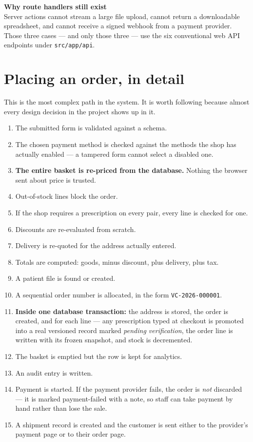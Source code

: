 \documentclass[11pt,a4paper]{report}
\newcommand{\code}[1]{\texttt{\small #1}}
\newcommand{\keybox}[2]{%
  \begin{center}
  \begin{minipage}{0.94\textwidth}
  \colorbox{vclight}{\parbox{\dimexpr\textwidth-2\fboxsep}{%
    \vspace{3pt}\textbf{\color{vcblue}#1}\\[3pt]#2\vspace{4pt}}}
  \end{minipage}
  \end{center}}
\begin{document}
\keybox{Why route handlers still exist}{Server actions cannot stream a large
file upload, cannot return a downloadable spreadsheet, and cannot receive a
signed webhook from a payment provider. Those three cases --- and only those
three --- use the six conventional web API endpoints under \code{src/app/api}.}

\section{Placing an order, in detail}

This is the most complex path in the system. It is worth following because
almost every design decision in the project shows up in it.

\begin{enumerate}
  \item The submitted form is validated against a schema.
  \item The chosen payment method is checked against the methods the shop has
        actually enabled --- a tampered form cannot select a disabled one.
  \item \textbf{The entire basket is re-priced from the database.} Nothing the
        browser sent about price is trusted.
  \item Out-of-stock lines block the order.
  \item If the shop requires a prescription on every pair, every line is
        checked for one.
  \item Discounts are re-evaluated from scratch.
  \item Delivery is re-quoted for the address actually entered.
  \item Totals are computed: goods, minus discount, plus delivery, plus tax.
  \item A patient file is found or created.
  \item A sequential order number is allocated, in the form
        \code{VC-2026-000001}.
  \item \textbf{Inside one database transaction:} the address is stored, the
        order is created, and for each line --- any prescription typed at
        checkout is promoted into a real versioned record marked \emph{pending
        verification}, the order line is written with its frozen snapshot, and
        stock is decremented.
  \item The basket is emptied but the row is kept for analytics.
  \item An audit entry is written.
  \item Payment is started. If the payment provider fails, the order is
        \emph{not} discarded --- it is marked payment-failed with a note, so
        staff can take payment by hand rather than lose the sale.
  \item A shipment record is created and the customer is sent either to the
        provider's payment page or to their order page.
\end{enumerate}
\end{document}
